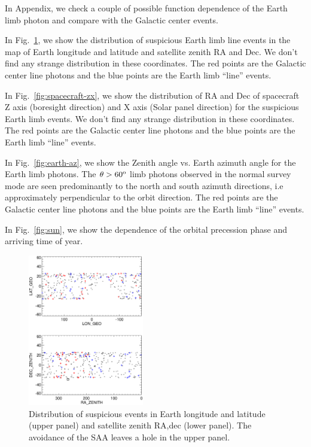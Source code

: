 \documentclass[aps,twocolumn,prd,superscriptaddress,showpacs,nofootinbib,fixfloat]{revtex4}
\newcommand{\degree}{^{\rm o}}
\begin{document}
\appendix

In Appendix, we check a couple of possible function
dependence of the Earth limb photon and compare with the
Galactic center events. 

In Fig.~\ref{fig:geo-lonlat}, we show the distribution of
suspicious Earth limb line events in the map of Earth
longitude and latitude and satellite zenith RA and Dec. We
don't find any strange distribution in these
coordinates. The red points are the Galactic center line
photons and the blue points are the Earth limb ``line''
events.

In Fig.~\ref{fig:spacecraft-zx}, we show the distribution of
RA and Dec of spacecraft Z axis (boresight direction) and X
axis (Solar panel direction) for the suspicious Earth limb
events. We don't find any strange distribution in these
coordinates. The red points are the Galactic center line
photons and the blue points are the Earth limb ``line''
events.

In Fig.~\ref{fig:earth-az}, we show the Zenith angle
vs. Earth azimuth angle for the Earth limb photons. The
$\theta > 60\degree$ limb photons observed in the normal
survey mode are seen predominantly to the north and south
azimuth directions, i.e approximately perpendicular to the
orbit direction. The red points are the Galactic center line
photons and the blue points are the Earth limb ``line''
events.

In Fig.~\ref{fig:sun}, we show the dependence of the orbital
precession phase and arriving time of year.



\begin{figure}
  \centering
  \includegraphics[width=0.45\textwidth]{plots/geo-lonlat.ps}
  \caption{Distribution of suspicious events in Earth
  longitude and latitude (upper panel) and satellite zenith
  RA,dec (lower panel).   The avoidance of the SAA leaves a
  hole in the upper panel.}
  \label{fig:geo-lonlat}
\end{figure}
\end{document}
